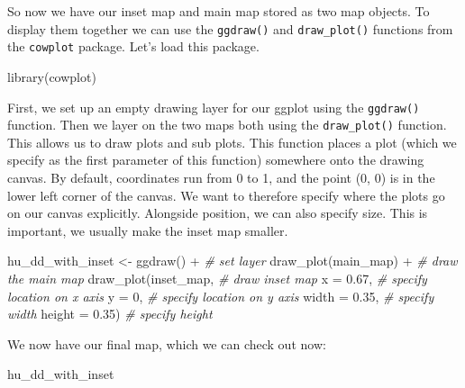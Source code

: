 \documentclass[
]{book}
\newenvironment{Shaded}{\begin{snugshade}}{\end{snugshade}}
\newcommand{\AttributeTok}[1]{\textcolor[rgb]{0.77,0.63,0.00}{#1}}
\newcommand{\CommentTok}[1]{\textcolor[rgb]{0.56,0.35,0.01}{\textit{#1}}}
\newcommand{\DecValTok}[1]{\textcolor[rgb]{0.00,0.00,0.81}{#1}}
\newcommand{\FloatTok}[1]{\textcolor[rgb]{0.00,0.00,0.81}{#1}}
\newcommand{\FunctionTok}[1]{\textcolor[rgb]{0.00,0.00,0.00}{#1}}
\newcommand{\NormalTok}[1]{#1}
\newcommand{\OtherTok}[1]{\textcolor[rgb]{0.56,0.35,0.01}{#1}}
\newcommand{\SpecialCharTok}[1]{\textcolor[rgb]{0.00,0.00,0.00}{#1}}
\begin{document}
So now we have our inset map and main map stored as two map objects. To display them together we can use the \texttt{ggdraw()} and \texttt{draw\_plot()} functions from the \texttt{cowplot} package. Let's load this package.

\begin{Shaded}
\begin{Highlighting}[]
\FunctionTok{library}\NormalTok{(cowplot)}
\end{Highlighting}
\end{Shaded}

First, we set up an empty drawing layer for our ggplot using the \texttt{ggdraw()} function. Then we layer on the two maps both using the \texttt{draw\_plot()} function. This allows us to draw plots and sub plots. This function places a plot (which we specify as the first parameter of this function) somewhere onto the drawing canvas. By default, coordinates run from 0 to 1, and the point (0, 0) is in the lower left corner of the canvas. We want to therefore specify where the plots go on our canvas explicitly. Alongside position, we can also specify size. This is important, we usually make the inset map smaller.

\begin{Shaded}
\begin{Highlighting}[]
\NormalTok{hu\_dd\_with\_inset }\OtherTok{\textless{}{-}} \FunctionTok{ggdraw}\NormalTok{() }\SpecialCharTok{+}  \CommentTok{\# set layer}
  \FunctionTok{draw\_plot}\NormalTok{(main\_map) }\SpecialCharTok{+}  \CommentTok{\# draw the main map}
  \FunctionTok{draw\_plot}\NormalTok{(inset\_map,   }\CommentTok{\# draw inset map}
            \AttributeTok{x =} \FloatTok{0.67}\NormalTok{,    }\CommentTok{\# specify location on x axis}
            \AttributeTok{y =} \DecValTok{0}\NormalTok{,    }\CommentTok{\# specify location on y axis}
            \AttributeTok{width =} \FloatTok{0.35}\NormalTok{,    }\CommentTok{\# specify width}
            \AttributeTok{height =} \FloatTok{0.35}\NormalTok{)   }\CommentTok{\# specify height}
\end{Highlighting}
\end{Shaded}

We now have our final map, which we can check out now:

\begin{Shaded}
\begin{Highlighting}[]
\NormalTok{hu\_dd\_with\_inset}
\end{Highlighting}
\end{Shaded}
\end{document}
